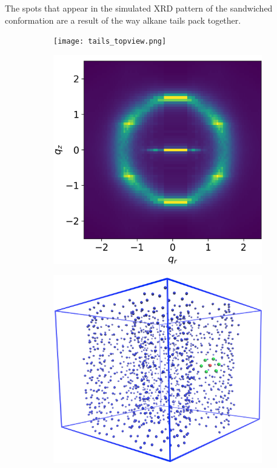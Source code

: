 \documentclass{article}
\begin{document}
  The spots that appear in the simulated XRD pattern of the sandwiched
  conformation are a result of the way alkane tails pack together.
  
  \begin{figure}
	\centering
	\begin{subfigure}{0.45\textwidth}
		\centering
		\hspace{-1cm}
		\vspace{1cm}
		\texttt{[image: tails\_topview.png]}
		\caption{}\label{fig:tails_topview}
	\end{subfigure}
	\begin{subfigure}{0.45\textwidth}
		\centering
		\includegraphics[width=\textwidth]{tails_rzplot.png}
		\caption{}\label{fig:tails_rzplot}
	\end{subfigure}
	\begin{subfigure}{0.45\textwidth}
		\centering
		\includegraphics[width=\textwidth]{centroids_box.png}

\end{subfigure}
\end{figure}
\end{document}
